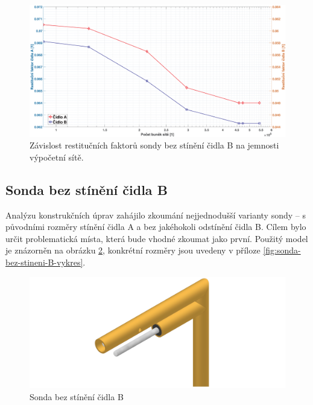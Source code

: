         \begin{figure}[ht!]
            \centering
            \includegraphics*[width=\textwidth]{400_SIMULACE_KONSTRUKCNICH_UPRAV/Grafy/citlivost_site.eps}
            \caption{Závislost restitučních faktorů sondy bez stínění čidla B na jemnosti výpočetní sítě.}
            \label{fig:citlivost-site}
        \end{figure}
    \newpage
    \subsection{Sonda bez stínění čidla B} \label{sec:sonda-bez-stineni-B}
        Analýzu konstrukčních úprav zahájilo zkoumání nejjednodušší varianty sondy – s původními rozměry stínění čidla A a bez jakéhokoli odstínění čidla B. Cílem bylo určit problematická místa, která bude vhodné zkoumat jako první. Použitý model je znázorněn na obrázku \ref{fig:sonda-bez-stineni-B}, konkrétní rozměry jsou uvedeny v příloze \ref{fig:sonda-bez-stineni-B-vykres}. 

        \begin{figure}[ht!]
            \centering
            \includegraphics[width=\textwidth]{400_SIMULACE_KONSTRUKCNICH_UPRAV/Vykresy_rendery/Sonda_bez_stineni_B.png}
            \caption{Sonda bez stínění čidla B}
            \label{fig:sonda-bez-stineni-B}
        \end{figure}
        
